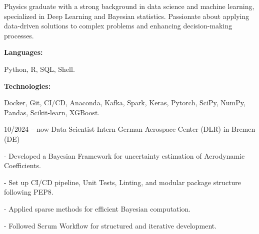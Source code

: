 \documentclass[9pt]{developercv} %
\begin{document}
\begin{minipage}[t]{0.46\textwidth}
	\vspace{-6pt}
 
    Physics graduate with a strong background in data science and machine learning, specialized 
    in Deep Learning and Bayesian statistics. 
    Passionate about applying data-driven solutions to complex problems and enhancing decision-making processes.
    
\end{minipage}
\hfill %
\begin{minipage}[t]{0.465\textwidth}
    \vspace{-6pt}
    
    \begin{minipage}[t]{0.2\textwidth}
        \textbf{Languages:}
    \end{minipage}
    \hfill
    \begin{minipage}[t]{0.73\textwidth}
      Python, R, SQL, Shell.  
    \end{minipage}
    \vspace{4mm}
    
    \begin{minipage}[t]{0.2\textwidth}
        \textbf{Technologies:}
    \end{minipage}
    \hfill
    \begin{minipage}[t]{0.73\textwidth}
      Docker, Git, CI/CD, Anaconda, Kafka, Spark, Keras, Pytorch, SciPy, NumPy, Pandas, Scikit-learn, XGBoost.
    \end{minipage}
    
\end{minipage}


\vspace{-10 pt}
\begin{entrylist}
	\entry
        {10/2024 -- now}
		{Data Scientist Intern}
		{German Aerospace Center (DLR) in Bremen (DE)}
            {- Developed a Bayesian Framework for uncertainty estimation of Aerodynamic Coefficients. 
            
            - Set up CI/CD pipeline, Unit Tests, Linting, and modular package structure following PEP8.
            
            - Applied sparse methods for efficient Bayesian computation.
            
            - Followed Scrum Workflow for structured and iterative development.}
		
\end{entrylist}
\end{document}
